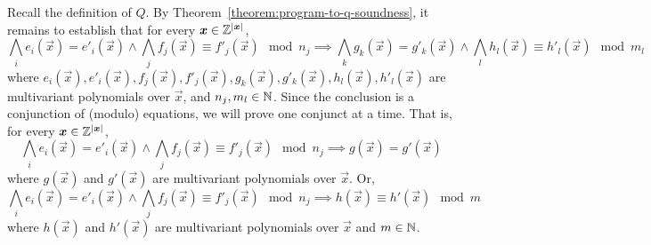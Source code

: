 Recall the definition of $Q$. By
Theorem~\ref{theorem:program-to-q-soundness}, it remains to establish
that for every $\vec{x} \in \bbfZ^{|\vec{x}|}$, 
\[
  \bigwedge\limits_i e_i (\vec{x}) = e'_i (\vec{x}) \wedge
  \bigwedge\limits_j f_j (\vec{x}) \equiv f'_j (\vec{x}) \mod n_j
  \implies
  \bigwedge\limits_k g_k (\vec{x}) = g'_k (\vec{x}) \wedge
  \bigwedge\limits_l   h_l (\vec{x}) \equiv h'_l (\vec{x}) \mod m_l
\]
where
$e_i (\vec{x}), e'_i (\vec{x}), f_j (\vec{x}), f'_j (\vec{x}),
 g_k (\vec{x}), g'_k (\vec{x}), h_l (\vec{x}), h'_l (\vec{x})$
are multivariant polynomials over $\vec{x}$, and
$n_j, m_l \in \mathbb{N} $. Since the conclusion is a conjunction of
(modulo) equations, we will prove one conjunct at a time. That is, for
every $\vec{x} \in \bbfZ^{|\vec{x}|}$, 
\[
  \bigwedge\limits_i e_i (\vec{x}) = e'_i (\vec{x}) \wedge
  \bigwedge\limits_j f_j (\vec{x}) \equiv f'_j (\vec{x}) \mod n_j
  \implies
  g (\vec{x}) = g' (\vec{x})
\] where $g (\vec{x})$ and $g' (\vec{x})$ are multivariant polynomials
over $\vec{x}$. Or,
\[
  \bigwedge\limits_i e_i (\vec{x}) = e'_i (\vec{x}) \wedge
  \bigwedge\limits_j f_j (\vec{x}) \equiv f'_j (\vec{x}) \mod n_j
  \implies
  h (\vec{x}) \equiv h' (\vec{x}) \mod m
\] where $h (\vec{x})$ and $h' (\vec{x})$ are multivariant polynomials
over $\vec{x}$ and $m \in \mathbb{N}$.
